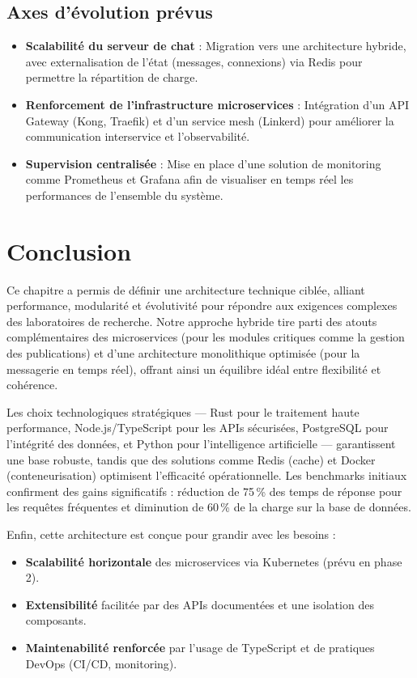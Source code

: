 \documentclass[12pt]{rapportPfe}
\begin{document}
\subsection{Axes d’évolution prévus}

\begin{itemize}
    \item \textbf{Scalabilité du serveur de chat} : Migration vers une architecture hybride, avec externalisation de l’état (messages, connexions) via Redis pour permettre la répartition de charge.
    
    \item \textbf{Renforcement de l'infrastructure microservices} : Intégration d’un API Gateway (Kong, Traefik) et d’un service mesh (Linkerd) pour améliorer la communication interservice et l'observabilité.
    
    \item \textbf{Supervision centralisée} : Mise en place d’une solution de monitoring comme Prometheus et Grafana afin de visualiser en temps réel les performances de l’ensemble du système.
\end{itemize}

\section{Conclusion}
Ce chapitre a permis de définir une architecture technique ciblée, alliant performance, modularité et évolutivité pour répondre aux exigences complexes des laboratoires de recherche. Notre approche hybride tire parti des atouts complémentaires des microservices (pour les modules critiques comme la gestion des publications) et d'une architecture monolithique optimisée (pour la messagerie en temps réel), offrant ainsi un équilibre idéal entre flexibilité et cohérence.

Les choix technologiques stratégiques — Rust pour le traitement haute performance, Node.js/TypeScript pour les APIs sécurisées, PostgreSQL pour l’intégrité des données, et Python pour l’intelligence artificielle — garantissent une base robuste, tandis que des solutions comme Redis (cache) et Docker (conteneurisation) optimisent l’efficacité opérationnelle. Les benchmarks initiaux confirment des gains significatifs : réduction de 75\,\% des temps de réponse pour les requêtes fréquentes et diminution de 60\,\% de la charge sur la base de données.

Enfin, cette architecture est conçue pour grandir avec les besoins :

\begin{itemize}
    \item \textbf{Scalabilité horizontale} des microservices via Kubernetes (prévu en phase 2).
    \item \textbf{Extensibilité} facilitée par des APIs documentées et une isolation des composants.
    \item \textbf{Maintenabilité renforcée} par l’usage de TypeScript et de pratiques DevOps (CI/CD, monitoring).
\end{itemize}
\end{document}
